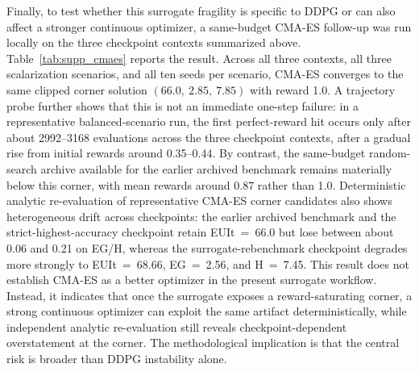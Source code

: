 Finally, to test whether this surrogate fragility is specific to DDPG or can also affect a stronger continuous optimizer, a same-budget CMA-ES follow-up was run locally on the three checkpoint contexts summarized above. Table~\ref{tab:supp_cmaes} reports the result. Across all three contexts, all three scalarization scenarios, and all ten seeds per scenario, CMA-ES converges to the same clipped corner solution $(66.0,\ 2.85,\ 7.85)$ with reward 1.0. A trajectory probe further shows that this is not an immediate one-step failure: in a representative balanced-scenario run, the first perfect-reward hit occurs only after about 2992--3168 evaluations across the three checkpoint contexts, after a gradual rise from initial rewards around 0.35--0.44. By contrast, the same-budget random-search archive available for the earlier archived benchmark remains materially below this corner, with mean rewards around 0.87 rather than 1.0. Deterministic analytic re-evaluation of representative CMA-ES corner candidates also shows heterogeneous drift across checkpoints: the earlier archived benchmark and the strict-highest-accuracy checkpoint retain EUIt~=~66.0 but lose between about 0.06 and 0.21 on EG/H, whereas the surrogate-rebenchmark checkpoint degrades more strongly to EUIt~=~68.66, EG~=~2.56, and H~=~7.45. This result does not establish CMA-ES as a better optimizer in the present surrogate workflow. Instead, it indicates that once the surrogate exposes a reward-saturating corner, a strong continuous optimizer can exploit the same artifact deterministically, while independent analytic re-evaluation still reveals checkpoint-dependent overstatement at the corner. The methodological implication is that the central risk is broader than DDPG instability alone.

